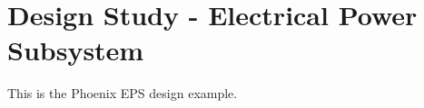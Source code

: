 \chapter{Design Study - Electrical Power Subsystem}\label{CH:Design2}
This is the Phoenix EPS design example.